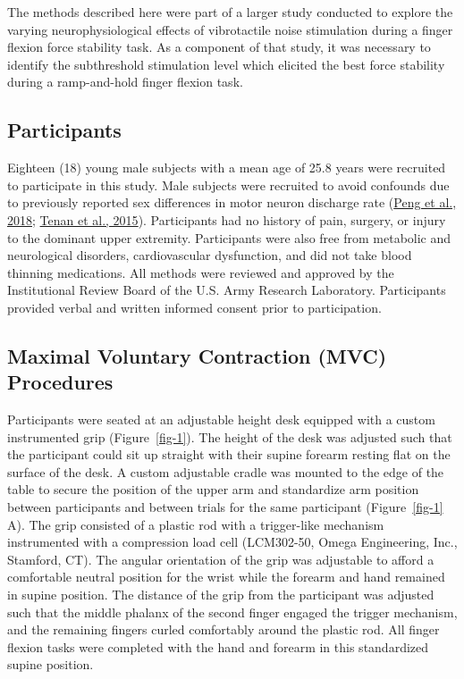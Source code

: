 \documentclass[]{cik}%
\begin{document}
The methods described here were part of a larger study conducted to
explore the varying neurophysiological effects of vibrotactile noise
stimulation during a finger flexion force stability task. As a component
of that study, it was necessary to identify the subthreshold stimulation
level which elicited the best force stability during a ramp-and-hold
finger flexion task.

\hypertarget{participants}{%
\subsection{Participants}\label{participants}}

Eighteen (18) young male subjects with a mean age of 25.8 years
were recruited to participate in this study. Male subjects were
recruited to avoid confounds due to previously reported sex differences
in motor neuron discharge rate (\protect\hyperlink{ref-Peng2018}{Peng et
al., 2018}; \protect\hyperlink{ref-Tenan2016}{Tenan et al., 2015}).
Participants had no history of pain, surgery, or injury to the dominant
upper extremity. Participants were also free from metabolic and
neurological disorders, cardiovascular dysfunction, and did not take
blood thinning medications. All methods were reviewed and approved by
the Institutional Review Board of the U.S. Army Research Laboratory.
Participants provided verbal and written informed consent prior to
participation.

\hypertarget{maximal-voluntary-contraction-mvc-procedures}{%
\subsection{Maximal Voluntary Contraction (MVC)
Procedures}\label{maximal-voluntary-contraction-mvc-procedures}}

Participants were seated at an adjustable height desk equipped with a
custom instrumented grip (Figure~\ref{fig-1}). The height of the desk
was adjusted such that the participant could sit up straight with their
supine forearm resting flat on the surface of the desk. A custom
adjustable cradle was mounted to the edge of the table to secure the
position of the upper arm and standardize arm position between
participants and between trials for the same participant
(Figure~\ref{fig-1} A). The grip consisted of a plastic rod with a
trigger-like mechanism instrumented with a compression load cell
(LCM302-50, Omega Engineering, Inc., Stamford, CT). The angular
orientation of the grip was adjustable to afford a comfortable neutral
position for the wrist while the forearm and hand remained in supine
position. The distance of the grip from the participant was adjusted
such that the middle phalanx of the second finger engaged the trigger
mechanism, and the remaining fingers curled comfortably around the
plastic rod. All finger flexion tasks were completed with the hand and
forearm in this standardized supine position.
\end{document}
